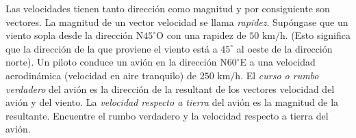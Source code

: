 \item Las velocidades tienen tanto dirección como magnitud y por consiguiente son vectores. La magnitud de un vector velocidad se llama \textit{rapidez}. Supóngase que un viento sopla desde la dirección N$45^\circ$O con una rapidez de $50\text{ km/h}$. (Esto significa que la dirección de la que proviene el viento está a $45^\circ$ al oeste de la dirección norte). Un piloto conduce un avión en la dirección N$60^\circ$E a una velocidad aerodinámica (velocidad en aire tranquilo) de $250\text{ km/h}$. El \textit{curso o rumbo verdadero} del avión es la dirección de la resultant de los vectores velocidad del avión y del viento. La \textit{velocidad respecto a tierra} del avión es la magnitud de la resultante. Encuentre el rumbo verdadero y la velocidad respecto a tierra del avión.
